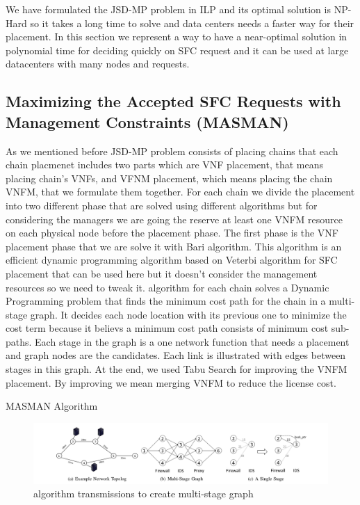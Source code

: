 We have formulated the JSD-MP problem in ILP and its optimal solution is NP-Hard so it takes a long time to solve and data centers needs a faster way for their placement.
In this section we represent a way to have a near-optimal solution in polynomial time for deciding quickly on SFC request and it can be used at large datacenters with many nodes and requests.

\subsection{Maximizing the Accepted SFC Requests with Management Constraints (MASMAN)}
As we mentioned before JSD-MP problem consists of placing chains that each chain placmenet includes two parts which are VNF placement, that means placing chain's VNFs, and VFNM placement, which means placing the chain VNFM, that we formulate them together.
For each chain we divide the placement into two different phase that are solved using different algorithms but for considering the managers we are going the reserve at least one VNFM resource on each physical node before the placement phase.
The first phase is the VNF placement phase that we are solve it with Bari \cite{Bari2015} algorithm.
This algorithm is an efficient dynamic programming algorithm based on Veterbi algorithm for SFC placement that can be used here but it doesn't consider the management resources so we need to tweak it.
\cite{Bari2015} algorithm for each chain solves a Dynamic Programming problem that finds the minimum cost path for the chain in a multi-stage graph.
It decides each node location with its previous one to minimize the cost term because it believs a minimum cost path consists of minimum cost sub-paths.
Each stage in the graph is a one network function that needs a placement and graph nodes are the candidates. Each link is illustrated with edges between stages in this graph.
At the end, we used Tabu Search for improving the VNFM placement. By improving we mean merging VNFM to reduce the license cost.

\begin{algorithm}
  \caption{MASMAN Algorithm}
  \label{alg:masman}
  \begin{algorithmic}[1]
    \EndFunction
  \end{algorithmic}
\end{algorithm}

\begin{figure}[h!]
  \centering
  \includegraphics[width=\textwidth]{images/bari.png}
  \caption{\cite{Bari2015} algorithm transmissions to create multi-stage graph}
\end{figure}

